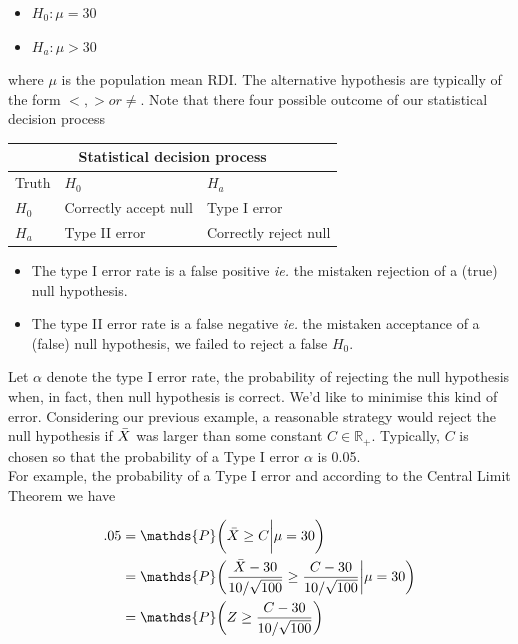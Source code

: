 \documentclass{homework}
\begin{document}
\begin{itemize}
    \item $H_0 : \mu = 30$ 
    \item $H_a : \mu > 30$ 
\end{itemize}

where $\mu$ is the population mean RDI. The alternative hypothesis are typically of the form $<,> or \neq$. Note that there four possible outcome of our statistical decision process\\

\begin{center}
\begin{tabular}{ |p{1cm}||p{5cm}|p{5cm}|  }
 \hline
 \multicolumn{3}{|c|}{Statistical decision process} \\
 \hline
 Truth& $H_0$ & $H_a$\\
 \hline
 $H_0$  & Correctly accept null & Type I error\\
 $H_a$ &  Type II error & Correctly reject null\\
 \hline
\end{tabular}
\end{center}

\begin{itemize}
    \item The type I error rate is a false positive \textit{ie.} the mistaken rejection of a (true) null hypothesis. 
    \item The type II error rate is a false negative \textit{ie.} the mistaken acceptance of a (false) null hypothesis, we failed to reject a false $H_0$.
\end{itemize}

Let $\alpha$ denote the type I error rate, the probability of rejecting the null hypothesis when, in fact, then null hypothesis is correct. We'd like to minimise this kind of error. Considering our previous example, a reasonable strategy would reject the null hypothesis if $\Bar{X}$ was larger than some constant $C \in \mathds{R}_{+}$. Typically, $C$ is chosen so that the probability of a Type I error $\alpha$ is 0.05. \\

For example, the probability of a Type I error and according to the Central Limit Theorem we have  

\begin{align*}
        .05 &= \mathds{P}\bigg(\Bar{X}\geq C \bigg| \mu = 30 \bigg) \\
        &=\mathds{P}\bigg(\frac{\Bar{X}-30}{10/\sqrt{100}}\geq \frac{C-30}{10/\sqrt{100}} \bigg| \mu = 30 \bigg) \\
        &= \mathds{P}\bigg(Z\geq \frac{C-30}{10/\sqrt{100}}\bigg)
\end{align*}
\end{document}
